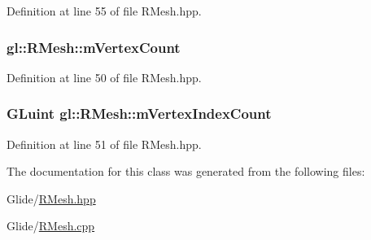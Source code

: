 Definition at line 55 of file R\-Mesh.\-hpp.

\hypertarget{classgl_1_1_r_mesh_a4edcf25786adf2e264c61c6b8d7f401f}{
\subsubsection[{m\-Vertex\-Count}]{ gl\-::\-R\-Mesh\-::m\-Vertex\-Count\hspace{0.3cm}{\ttfamily [protected]}}}\label{classgl_1_1_r_mesh_a4edcf25786adf2e264c61c6b8d7f401f}


Definition at line 50 of file R\-Mesh.\-hpp.

\hypertarget{classgl_1_1_r_mesh_afdfd8a88b91096eb4b23ca9786587c61}{
\subsubsection[{m\-Vertex\-Index\-Count}]{\setlength{\rightskip}{0pt plus 5cm}G\-Luint gl\-::\-R\-Mesh\-::m\-Vertex\-Index\-Count\hspace{0.3cm}{\ttfamily [protected]}}}\label{classgl_1_1_r_mesh_afdfd8a88b91096eb4b23ca9786587c61}


Definition at line 51 of file R\-Mesh.\-hpp.



The documentation for this class was generated from the following files\-:\begin{DoxyCompactItemize}
\item 
Glide/\hyperlink{_r_mesh_8hpp}{R\-Mesh.\-hpp}\item 
Glide/\hyperlink{_r_mesh_8cpp}{R\-Mesh.\-cpp}\end{DoxyCompactItemize}
